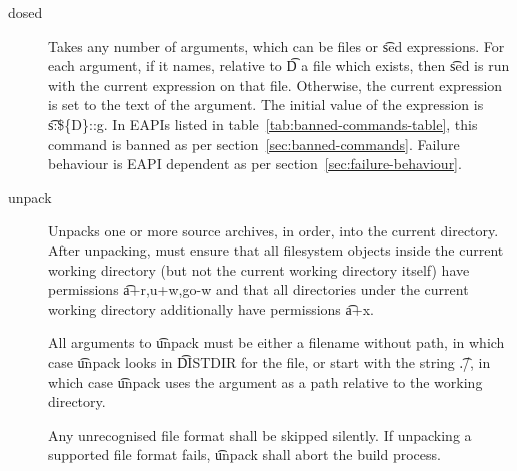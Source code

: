 \begin{description}
\item[dosed] Takes any number of arguments, which can be files or \t{sed} expressions. For each
    argument, if it names, relative to \t{D} a file which exists, then \t{sed} is run with the
    current expression on that file. Otherwise, the current expression is set to the text of the
    argument. The initial value of the expression is \t{s:\$\{D\}::g}. In EAPIs listed in
    table~\ref{tab:banned-commands-table}, this command is banned as per
    section~\ref{sec:banned-commands}. Failure behaviour is EAPI dependent as per
    section~\ref{sec:failure-behaviour}.

\item[unpack] Unpacks one or more source archives, in order, into the current directory. After
    unpacking, must ensure that all filesystem objects inside the current working directory (but not
    the current working directory itself) have permissions \t{a+r,u+w,go-w} and that all directories
    under the current working directory additionally have permissions \t{a+x}.

    All arguments to \t{unpack} must be either a filename without path, in which case \t{unpack}
    looks in \t{DISTDIR} for the file, or start with the string \t{./}, in which case \t{unpack}
    uses the argument as a path relative to the working directory.

    Any unrecognised file format shall be skipped silently. If unpacking a supported file format
    fails, \t{unpack} shall abort the build process.


\end{description}
